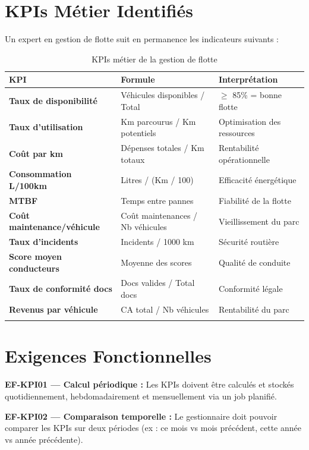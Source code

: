 \documentclass[12pt,a4paper]{report}
\begin{document}
\section{KPIs Métier Identifiés}

Un expert en gestion de flotte suit en permanence les indicateurs suivants :

\begin{longtable}{p{4cm}p{4cm}p{5cm}}
\toprule
\textbf{KPI} & \textbf{Formule} & \textbf{Interprétation} \\
\midrule
\endhead
\textbf{Taux de disponibilité} & Véhicules disponibles / Total & $\geq$ 85\% = bonne flotte \\
\textbf{Taux d'utilisation} & Km parcourus / Km potentiels & Optimisation des ressources \\
\textbf{Coût par km} & Dépenses totales / Km totaux & Rentabilité opérationnelle \\
\textbf{Consommation L/100km} & Litres / (Km / 100) & Efficacité énergétique \\
\textbf{MTBF} & Temps entre pannes & Fiabilité de la flotte \\
\textbf{Coût maintenance/véhicule} & Coût maintenances / Nb véhicules & Vieillissement du parc \\
\textbf{Taux d'incidents} & Incidents / 1000 km & Sécurité routière \\
\textbf{Score moyen conducteurs} & Moyenne des scores & Qualité de conduite \\
\textbf{Taux de conformité docs} & Docs valides / Total docs & Conformité légale \\
\textbf{Revenus par véhicule} & CA total / Nb véhicules & Rentabilité du parc \\
\bottomrule
\caption{KPIs métier de la gestion de flotte}
\end{longtable}

\section{Exigences Fonctionnelles}

\begin{reqbox}
\textbf{EF-KPI01 — Calcul périodique :} Les KPIs doivent être calculés et stockés quotidiennement, hebdomadairement et mensuellement via un job planifié.
\end{reqbox}

\begin{reqbox}
\textbf{EF-KPI02 — Comparaison temporelle :} Le gestionnaire doit pouvoir comparer les KPIs sur deux périodes (ex : ce mois vs mois précédent, cette année vs année précédente).
\end{reqbox}
\end{document}
